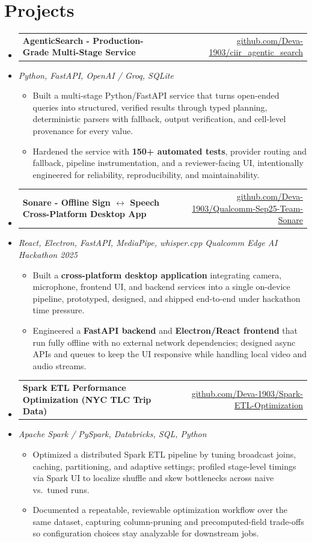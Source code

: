 \documentclass[letterpaper,10pt]{article}
\makeatletter
\newcommand{\resumeItem}[1]{
  \item\small{#1\vspace{-1pt}}
}
\newcommand{\resumeProjectHeading}[2]{
    \item
    \begin{tabular*}{0.985\textwidth}[t]{l@{\extracolsep{\fill}}r}
      \small\textbf{#1} & \small #2 \\
    \end{tabular*}\vspace{-5pt}
}
\newcommand{\resumeProjectSubheading}[1]{
  \vspace{-2pt}\item[] {\small\textcolor{ResumeSlate}{\emph{#1}}}\vspace{-3pt}
}
\newcommand{\resumeSubHeadingListStart}{\begin{itemize}[leftmargin=0.0in, label={}, itemsep=2pt, topsep=2pt]}
\newcommand{\resumeSubHeadingListEnd}{\end{itemize}}
\newcommand{\resumeItemListStart}{\begin{itemize}[leftmargin=0.18in, itemsep=2pt, topsep=1pt]}
\newcommand{\resumeItemListEnd}{\end{itemize}\vspace{-4pt}}
\makeatother
\begin{document}
\section{Projects}
\resumeSubHeadingListStart
  \resumeProjectHeading
    {AgenticSearch - Production-Grade Multi-Stage Service}
    {\href{https://github.com/Deva-1903/ciir_agentic_search}{github.com/Deva-1903/ciir\_agentic\_search}}
  \resumeProjectSubheading{Python, FastAPI, OpenAI / Groq, SQLite}
    \resumeItemListStart
      \resumeItem{Built a multi-stage Python/FastAPI service that turns open-ended queries into structured, verified results through typed planning, deterministic parsers with fallback, output verification, and cell-level provenance for every value.}
      \resumeItem{Hardened the service with \textbf{150+ automated tests}, provider routing and fallback, pipeline instrumentation, and a reviewer-facing UI, intentionally engineered for reliability, reproducibility, and maintainability.}
    \resumeItemListEnd
  \resumeProjectHeading
    {Sonare - Offline Sign \(\leftrightarrow\) Speech Cross-Platform Desktop App}
    {\href{https://github.com/Deva-1903/Qualcomm-Sep25-Team-Sonare}{github.com/Deva-1903/Qualcomm-Sep25-Team-Sonare}}
  \resumeProjectSubheading{React, Electron, FastAPI, MediaPipe, whisper.cpp \enspace\textbar\enspace Qualcomm Edge AI Hackathon 2025}
    \resumeItemListStart
      \resumeItem{Built a \textbf{cross-platform desktop application} integrating camera, microphone, frontend UI, and backend services into a single on-device pipeline, prototyped, designed, and shipped end-to-end under hackathon time pressure.}
      \resumeItem{Engineered a \textbf{FastAPI backend} and \textbf{Electron/React frontend} that run fully offline with no external network dependencies; designed async APIs and queues to keep the UI responsive while handling local video and audio streams.}
    \resumeItemListEnd
  \resumeProjectHeading
    {Spark ETL Performance Optimization (NYC TLC Trip Data)}
    {\href{https://github.com/Deva-1903/Spark-ETL-Optimization}{github.com/Deva-1903/Spark-ETL-Optimization}}
  \resumeProjectSubheading{Apache Spark / PySpark, Databricks, SQL, Python}
    \resumeItemListStart
      \resumeItem{Optimized a distributed Spark ETL pipeline by tuning broadcast joins, caching, partitioning, and adaptive settings; profiled stage-level timings via Spark UI to localize shuffle and skew bottlenecks across naive vs.\ tuned runs.}
      \resumeItem{Documented a repeatable, reviewable optimization workflow over the same dataset, capturing column-pruning and precomputed-field trade-offs so configuration choices stay analyzable for downstream jobs.}
    \resumeItemListEnd
\resumeSubHeadingListEnd
\vspace{-4pt}
\end{document}
